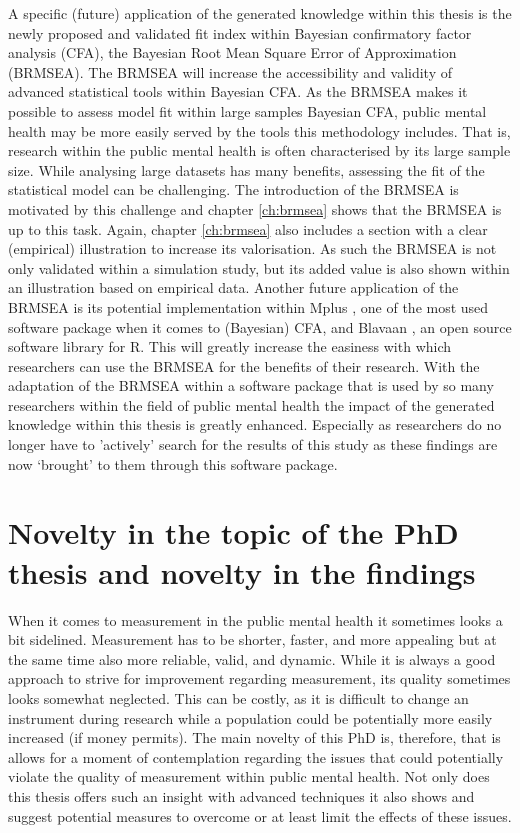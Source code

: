 A specific (future) application of the generated knowledge within this thesis is the newly proposed and validated fit index within Bayesian confirmatory factor analysis (CFA), the Bayesian Root Mean Square Error of Approximation (BRMSEA). 
The BRMSEA will increase the accessibility and validity of advanced statistical tools within Bayesian CFA. 
As the BRMSEA makes it possible to assess model fit within large samples Bayesian CFA, public mental health may be more easily served by the tools this methodology includes. 
That is, research within the public mental health is often characterised by its large sample size. 
While analysing large datasets has many benefits, assessing the fit of the statistical model can be challenging. 
The introduction of the BRMSEA is motivated by this challenge and chapter \ref{ch:brmsea} shows that the BRMSEA is up to this task. 
Again, chapter \ref{ch:brmsea} also includes a section with a clear (empirical) illustration to increase its valorisation. As such the BRMSEA is not only validated within a simulation study, but its added value is also shown within an illustration based on empirical data. 
Another future application of the BRMSEA is its potential implementation within Mplus \parencite{Muthen_1998}, one of the most used software package when it comes to (Bayesian) CFA, and Blavaan \parencite{Merkle_2016}, an open source software library for R. 
This will greatly increase the easiness with which researchers can use the BRMSEA for the benefits of their research. 
With the adaptation of the BRMSEA within a software package that is used by so many researchers within the field of public mental health the impact of the generated knowledge within this thesis is greatly enhanced. 
Especially as researchers do no longer have to 'actively' search for the results of this study as these findings are now `brought' to them through this software package.

\section*{Novelty in the topic of the PhD thesis and novelty in the findings}
When it comes to measurement in the public mental health it sometimes looks a bit sidelined. 
Measurement has to be shorter, faster, and more appealing but at the same time also more reliable, valid, and dynamic. 
While it is always a good approach to strive for improvement regarding measurement, its quality sometimes looks somewhat neglected. 
This can be costly, as it is difficult to change an instrument during research while a population could be potentially more easily increased (if money permits). 
The main novelty of this PhD is, therefore, that is allows for a moment of contemplation regarding the issues that could potentially violate the quality of measurement within public mental health. 
Not only does this thesis offers such an insight with advanced techniques it also shows and suggest potential measures to overcome or at least limit the effects of these issues. 

